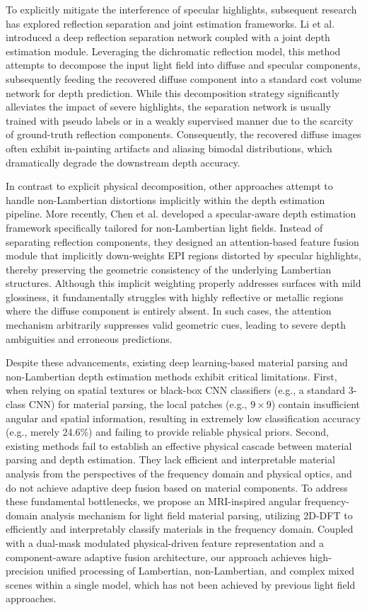 \documentclass[lettersize,journal]{IEEEtran}
\begin{document}
To explicitly mitigate the interference of specular highlights, subsequent research has explored reflection separation and joint estimation frameworks. Li et al. \cite{lili} introduced a deep reflection separation network coupled with a joint depth estimation module. Leveraging the dichromatic reflection model, this method attempts to decompose the input light field into diffuse and specular components, subsequently feeding the recovered diffuse component into a standard cost volume network for depth prediction. While this decomposition strategy significantly alleviates the impact of severe highlights, the separation network is usually trained with pseudo labels or in a weakly supervised manner due to the scarcity of ground-truth reflection components. Consequently, the recovered diffuse images often exhibit in-painting artifacts and aliasing bimodal distributions, which dramatically degrade the downstream depth accuracy.

In contrast to explicit physical decomposition, other approaches attempt to handle non-Lambertian distortions implicitly within the depth estimation pipeline. More recently, Chen et al. \cite{chenchen} developed a specular-aware depth estimation framework specifically tailored for non-Lambertian light fields. Instead of separating reflection components, they designed an attention-based feature fusion module that implicitly down-weights EPI regions distorted by specular highlights, thereby preserving the geometric consistency of the underlying Lambertian structures. Although this implicit weighting properly addresses surfaces with mild glossiness, it fundamentally struggles with highly reflective or metallic regions where the diffuse component is entirely absent. In such cases, the attention mechanism arbitrarily suppresses valid geometric cues, leading to severe depth ambiguities and erroneous predictions.

Despite these advancements, existing deep learning-based material parsing and non-Lambertian depth estimation methods exhibit critical limitations. First, when relying on spatial textures or black-box CNN classifiers (e.g., a standard 3-class CNN) for material parsing, the local patches (e.g., $9 \times 9$) contain insufficient angular and spatial information, resulting in extremely low classification accuracy (e.g., merely 24.6\%) and failing to provide reliable physical priors. Second, existing methods fail to establish an effective physical cascade between material parsing and depth estimation. They lack efficient and interpretable material analysis from the perspectives of the frequency domain and physical optics, and do not achieve adaptive deep fusion based on material components. To address these fundamental bottlenecks, we propose an MRI-inspired angular frequency-domain analysis mechanism for light field material parsing, utilizing 2D-DFT to efficiently and interpretably classify materials in the frequency domain. Coupled with a dual-mask modulated physical-driven feature representation and a component-aware adaptive fusion architecture, our approach achieves high-precision unified processing of Lambertian, non-Lambertian, and complex mixed scenes within a single model, which has not been achieved by previous light field approaches.
\end{document}
